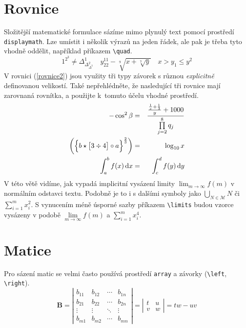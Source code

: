 \documentclass[hidelinks, 11pt, a4paper, twocolumn]{article}
\theoremstyle{definition}
\theoremstyle{definition}
\begin{document}
\section{Rovnice}
Složitější matematické formulace sázíme mimo plynulý text pomocí prostředí \texttt{displaymath}. Lze umístit i několik výrazů na jeden
 řádek, ale pak je třeba tyto vhodně oddělit, například příkazem \verb|\quad|.
 \begin{displaymath}
    1^{2^3} \neq \Delta^1_{\Delta^2_{\Delta^3}}
    \quad y^{11}_{22} - \sqrt[9]{x + \sqrt[7]{y}}
    \quad x > y_1 \leq y^2   
 \end{displaymath}
 V rovnici (\ref{rovnice2}) jsou využity tři typy závorek s různou
  \emph{explicitně} definovanou velikostí. Také nepřehlédněte, že nasledující tři rovnice mají zarovnaná rovnítka, a použijte k~tomuto
   účelu vhodné prostředí.
   \begin{eqnarray}
        \label{rovnice1}
        -\cos^2 \beta & = & \frac{\frac{\frac{1}{x}+\frac{1}{3}}{y}+1000}{\prod\limits _{j=2}^8 q_j}\\
        \label{rovnice2}
        \biggl(\Bigl\{b \star \bigl[3 \div 4\bigr] \circ a \Bigr\}^{\frac{2}{3}}\biggr) & = & \log_{10}x\\
        \label{rovnice3}
        \int_a^b f(x)\,\mathrm{d}x & = & \int_c^d f(y)\,\mathrm{d}y
   \end{eqnarray}
   V této větě vidíme, jak vypadá implicitní vysázení limity $\lim_{m\to\infty}f(m)$ v normálním odstavci textu. Podobně je to i
    s dalšími symboly jako $\bigcup_{N \in \mathcal{M}}N $ či $\sum_{i=1}^{m} x^2_i $.
     S vynucením méně úsporné sazby příkazem \verb|\limits| budou vzorce vysázeny v podobě $\lim\limits _{m \to \infty} f(m)$ a $\sum\limits _{i=1}^{m} x^4_i$.

\section{Matice}
Pro sázení matic se velmi často používá prostředí \texttt{array} a závorky (\verb|\left|, \verb|\right|).
$$
\mathbf{B} = \left| \begin{array}{cccc}
    b_{11} & b_{12} & \cdots & b_{1n}\\ 
    b_{21} & b_{22} & \cdots & b_{2n} \\
    \vdots & \vdots & \ddots & \vdots \\
    b_{m1} & b_{m2} & \cdots & b_{mn} 
\end{array}
\right| = \left|\begin{array}{cc}
    t & u \\
    v & w 
\end{array}
\right| = tw - uv
$$
 
\end{document}
